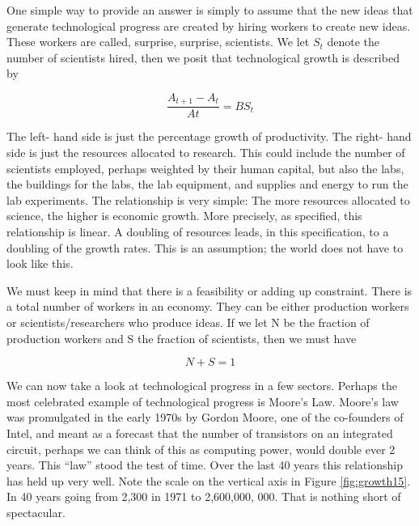 \documentclass[
]{book}
\begin{document}
One simple way to provide an answer is simply to assume that the new ideas that generate technological progress are created by hiring workers to create new ideas. These workers are called, surprise, surprise, scientists. We let \(S_t\) denote the number of scientists hired, then we posit that technological growth is described by

\[ \frac{A_{t+1} - A_t}{At}  =  B S_t\]

The left- hand side is just the percentage growth of productivity. The right- hand side is just the resources allocated to research. This could include the number of scientists employed, perhaps weighted by their human capital, but also the labs, the buildings for the labs, the lab equipment, and supplies and energy to run the lab experiments. The relationship is very simple: The more resources allocated to science, the higher is economic growth. More precisely, as specified, this relationship is linear. A doubling of resources leads, in this specification, to a doubling of the growth rates. This is an assumption; the world does not have to look like this.

We must keep in mind that there is a feasibility or adding up constraint. There is a total number of workers in an economy. They can be either production workers or scientists/researchers who produce ideas. If we let N be the fraction of production workers and S the fraction of scientists, then we must have

\[ N + S = 1 \]

We can now take a look at technological progress in a few sectors. Perhaps the most celebrated example of technological progress is Moore's Law. Moore's law was promulgated in the early 1970s by Gordon Moore, one of the co-founders of Intel, and meant as a forecast that the number of transistors on an integrated circuit, perhaps we can think of this as computing power, would double ever 2 years. This ``law'' stood the test of time. Over the last 40 years this relationship has held up very well. Note the scale on the vertical axis in Figure \ref{fig:growth15}. In 40 years going from 2,300 in 1971 to 2,600,000, 000. That is nothing short of spectacular.
\end{document}
